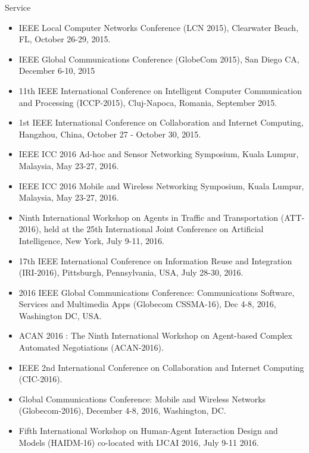 \begin{category}{Service}
\begin{itemize}
\item IEEE Local Computer Networks Conference (LCN 2015), Clearwater Beach, FL, October 26-29, 2015.

\item IEEE Global Communications Conference (GlobeCom 2015), San Diego CA, December 6-10, 2015

\item 11th IEEE International Conference on
Intelligent Computer Communication and Processing (ICCP-2015), Cluj-Napoca, Romania, September 2015.

\item 1st IEEE International Conference on Collaboration and Internet Computing, Hangzhou, China, October 27 - October 30, 2015.

\item IEEE ICC 2016 Ad-hoc and Sensor Networking Symposium, Kuala Lumpur, Malaysia, May 23-27, 2016.

\item IEEE ICC 2016 Mobile and Wireless Networking Symposium, Kuala Lumpur, Malaysia, May 23-27, 2016.

\item  Ninth International Workshop on Agents in Traffic and Transportation (ATT-2016), held at the 25th International Joint Conference on Artificial Intelligence, New York, July 9-11, 2016.

\item 17th IEEE International Conference on Information Reuse and Integration (IRI-2016), Pittsburgh, Pennsylvania, USA, July 28-30, 2016.

\item 2016 IEEE Global Communications Conference: Communications Software, Services and Multimedia Apps (Globecom CSSMA-16), Dec 4-8, 2016, Washington DC, USA.

\item ACAN 2016 : The Ninth International Workshop on Agent-based Complex Automated Negotiations (ACAN-2016).

\item IEEE 2nd International Conference on Collaboration and Internet Computing (CIC-2016).

\item Global Communications Conference: Mobile and Wireless Networks (Globecom-2016), December 4-8, 2016, Washington, DC.

\item Fifth International Workshop on Human-Agent Interaction Design and Models (HAIDM-16) co-located with IJCAI 2016, July 9-11 2016.


\end{itemize}
\end{category}
